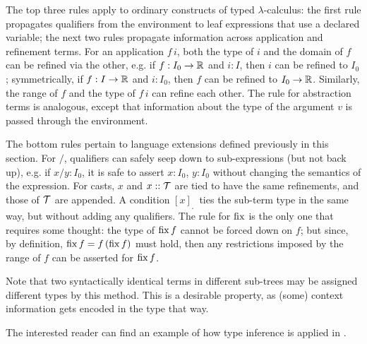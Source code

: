 \medskip
\cbstart{}%
The top three rules apply to ordinary constructs of typed $\lambda$-calculus:
the first rule propagates qualifiers from the environment to leaf expressions that use a declared variable;
the next two rules propagate information across application and refinement terms.
For an application $f\,i$, both the type of $i$ and the domain of $f$ can be refined
via the other, e.g. if $f:I_0\to\mathbb{R}$ and $i:I$, then $i$ can be refined to $I_0$; 
symmetrically, if $f:I\to\mathbb{R}$ and $i:I_0$, then $f$ can be refined to $I_0\to\mathbb{R}$.
Similarly, the range of $f$ and the type of $f\,i$ can refine each other.
The rule for abstraction terms is analogous, except that information about the type
of the argument $v$ is passed through the environment.

The bottom rules pertain to language extensions defined previously in this section.
For $/$, qualifiers can safely seep down to sub-expressions (but not back up), e.g. if $x/y:I_0$,
it is safe to assert $x:I_0$, $y:I_0$ without changing the semantics of the expression.
For casts, $x$ and $x::\mathcal{T}$ are tied to have the same refinements, and those
of $\mathcal{T}$ are appended. 
A condition $[x]_{_\square}\,$ ties the sub-term type in the same way, but without
adding any qualifiers. The rule for $\operatorname{fix}$ is the only one that requires some thought:
the type of $\operatorname{fix} f$ cannot be forced down on $f$; but since, by definition, $\operatorname{fix} f = f\,(\operatorname{fix} f)$
must hold, then any restrictions imposed by the range of $f$ can be asserted for $\operatorname{fix} f$.
\cbend

Note that two syntactically identical terms in different sub-trees may be assigned
different types by this method. This is a desirable property, as (some) context information
gets encoded in the type that way.

The interested reader can find an example of how type inference is applied in .

